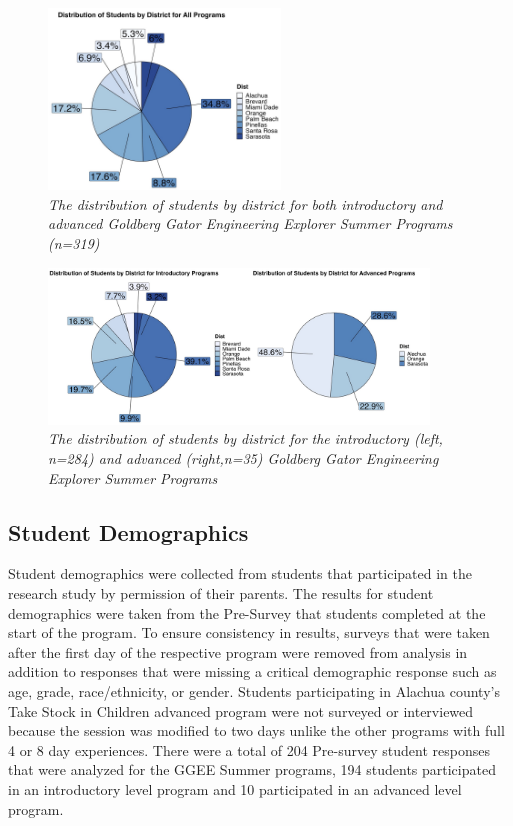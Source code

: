 \documentclass[
]{article}
\begin{document}
\begin{figure}
\centering
\includegraphics[width=0.55\textwidth,height=\textheight]{Graphs/Report/GGEE_23_District_All.jpg}
\caption{\emph{The distribution of students by district for both
introductory and advanced Goldberg Gator Engineering Explorer Summer
Programs (n=319)}}
\end{figure}

\begin{figure}
\centering
\includegraphics[width=0.9\textwidth,height=\textheight]{Graphs/Report/GGEE_23_District_IA.jpg}
\caption{\emph{The distribution of students by district for the
introductory (left, n=284) and advanced (right,n=35) Goldberg Gator
Engineering Explorer Summer Programs}}
\end{figure}

\hypertarget{student-demographics}{%
\subsection{Student Demographics}\label{student-demographics}}

Student demographics were collected from students that participated in
the research study by permission of their parents. The results for
student demographics were taken from the Pre-Survey that students
completed at the start of the program. To ensure consistency in results,
surveys that were taken after the first day of the respective program
were removed from analysis in addition to responses that were missing a
critical demographic response such as age, grade, race/ethnicity, or
gender. Students participating in Alachua county's Take Stock in
Children advanced program were not surveyed or interviewed because the
session was modified to two days unlike the other programs with full 4
or 8 day experiences. There were a total of 204 Pre-survey student
responses that were analyzed for the GGEE Summer programs, 194 students
participated in an introductory level program and 10 participated in an
advanced level program.
\end{document}
